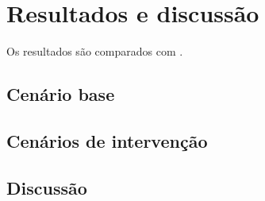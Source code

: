 \chapter{Resultados e discussão}
\label{cap:resultados}

\lipsum[1]

Os resultados são comparados com \cite{Saba2022}.

\section{Cenário base}
\lipsum[2-3]

\section{Cenários de intervenção}
\lipsum[3-4]

\section{Discussão}
\lipsum[4-5]
